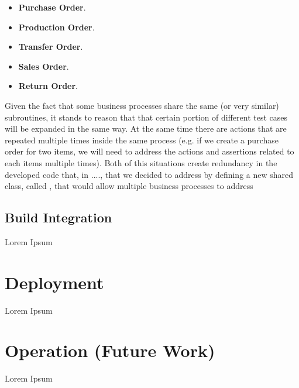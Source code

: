 \begin{itemize}
    \item \textbf{Purchase Order}.
    \item \textbf{Production Order}.
    \item \textbf{Transfer Order}.
    \item \textbf{Sales Order}. 
    \item \textbf{Return Order}.
\end{itemize}

Given the fact that some business processes share the same (or very similar) subroutines, it stands to reason that that certain portion of different test cases will be expanded in the same way. At the same time there are actions that are repeated multiple times inside the same process (e.g. if we create a purchase order for two items, we will need to address the actions and assertions related to each items multiple times). Both of this situations create redundancy in the developed code that, in ....,  that we decided to address by defining a new shared class, called \textit{}, that would allow multiple business processes to address  

\subsection{Build Integration}

Lorem Ipsum

\section{Deployment}

Lorem Ipsum

\section{Operation (Future Work)} 

Lorem Ipsum